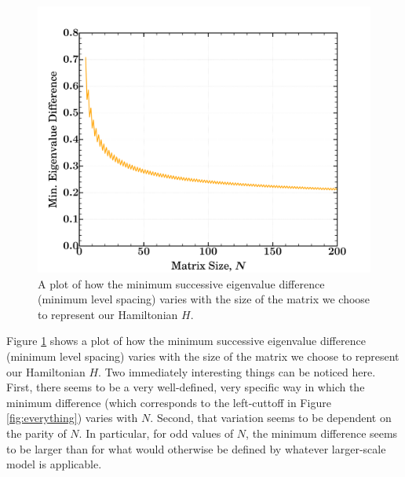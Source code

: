\documentclass{amsproc}
\theoremstyle{definition}
\theoremstyle{remark}
\numberwithin{equation}{section}
\begin{document}
\begin{figure}
\includegraphics[width=\columnwidth]{figures/qm_min_eigenvalues_differences.pdf}
\caption{A plot of how the minimum successive eigenvalue difference (minimum level spacing) varies with the size of the matrix we choose to represent our Hamiltonian $H$. }
\label{fig:qm_min_eigenvalues_differences}
\end{figure}

Figure \ref{fig:qm_min_eigenvalues_differences} shows a plot of how the minimum successive eigenvalue difference (minimum level spacing) varies with the size of the matrix we choose to represent our Hamiltonian $H$. Two immediately interesting things can be noticed here. First, there seems to be a very well-defined, very specific way in which the minimum difference (which corresponds to the left-cuttoff in Figure \ref{fig:everything}) varies with $N$. Second, that variation seems to be dependent on the parity of $N$. In particular, for odd values of $N$, the minimum difference seems to be larger than for what would otherwise be defined by whatever larger-scale model is applicable.
\end{document}
